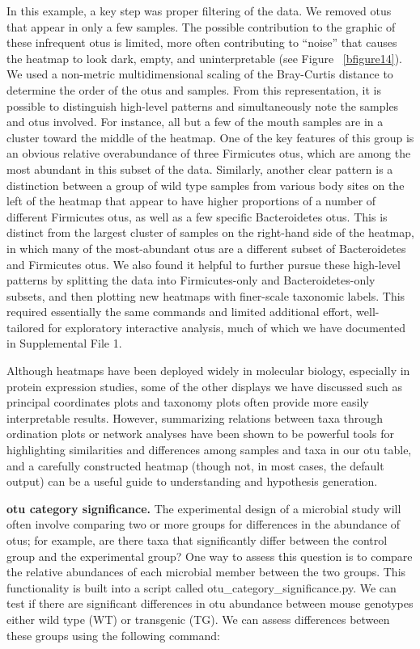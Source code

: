 In this example, a key step was proper filtering of the data. We removed \gls{otu}s that appear in only a
few samples. The possible contribution to the graphic of these infrequent \gls{otu}s is limited, more often
contributing to “noise” that causes the heatmap to look dark, empty, and uninterpretable (see Figure ~\ref{bfigure14}).
We used a non-metric multidimensional scaling of the Bray-Curtis distance to determine the order of the \gls{otu}s and
samples. From this representation, it is possible to distinguish high-level patterns and simultaneously note the
samples and \gls{otu}s involved. For instance, all but a few of the mouth samples are in a cluster toward the middle of the
heatmap. One of the key features of this group is an obvious relative overabundance of three Firmicutes \gls{otu}s, which
are among the most abundant in this subset of the data. Similarly, another clear pattern is a distinction between a
group of wild type samples from various body sites on the left of the heatmap that appear to have higher proportions
of a number of different Firmicutes \gls{otu}s, as well as a few specific Bacteroidetes \gls{otu}s. This is distinct from the
largest cluster of samples on the right-hand side of the heatmap, in which many of the most-abundant \gls{otu}s are a
different subset of Bacteroidetes and Firmicutes \gls{otu}s. We also found it helpful to further pursue these high-level
patterns by splitting the data into Firmicutes-only and Bacteroidetes-only subsets, and then plotting new heatmaps
with finer-scale taxonomic labels. This required essentially the same commands and limited additional effort, well-tailored
for exploratory interactive analysis, much of which we have documented in Supplemental File 1.

Although heatmaps have been deployed widely in molecular biology, especially in protein expression studies, some of the
other displays we have discussed such as principal coordinates plots and taxonomy plots often provide more easily
interpretable results. However, summarizing relations between taxa through ordination plots or network analyses
have been shown to be powerful tools for highlighting similarities and differences among samples and taxa in our
\gls{otu} table, and a carefully constructed heatmap (though not, in most cases, the default output) can be a useful
guide to understanding and hypothesis generation.

\textbf{\gls{otu} category significance.} The experimental design of a microbial study will often involve
comparing two or more groups for differences in the abundance of \gls{otu}s; for example, are there taxa
that significantly differ between the control group and the experimental group? One way to assess
this question is to compare the relative abundances of each microbial member between the two groups.
This functionality is built into a script called otu\_category\_significance.py. We can test if there
are significant differences in \gls{otu} abundance between mouse genotypes either wild type (WT) or transgenic
(TG). We can assess differences between these groups using the following command:

